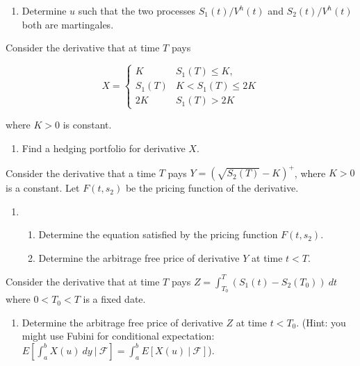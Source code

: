 \documentclass[a4paper,12pt,openany]{book}
\providecommand{\tightlist}{%
 \setlength{\itemsep}{0pt}\setlength{\parskip}{0pt}}
\begin{document}
\begin{enumerate}
\def\labelenumi{\alph{enumi}.}
\setcounter{enumi}{1}
\tightlist
\item
  Determine \(u\) such that the two processes \(S_1(t)/V^h(t)\) and \(S_2(t)/V^h(t)\) both are martingales.
\end{enumerate}

Consider the derivative that at time \(T\) pays

\[
X=
\begin{cases}
K & S_1(T)\le K,\\
S_1(T) & K<S_1(T)\le 2K\\
2K & S_1(T)>2K
\end{cases}
\]

where \(K>0\) is constant.

\begin{enumerate}
\def\labelenumi{\alph{enumi}.}
\setcounter{enumi}{2}
\tightlist
\item
  Find a hedging portfolio for derivative \(X\).
\end{enumerate}

Consider the derivative that a time \(T\) pays \(Y=\left(\sqrt{S_2(T)}-K\right)^+\), where \(K>0\) is a constant. Let \(F(t,s_2)\) be the pricing function of the derivative.

\begin{enumerate}
\def\labelenumi{\alph{enumi}.}
\setcounter{enumi}{3}
\item
  \begin{enumerate}
  \def\labelenumii{\roman{enumii}.}
  \tightlist
  \item
    Determine the equation satisfied by the pricing function \(F(t,s_2)\).
  \item
    Determine the arbitrage free price of derivative \(Y\) at time \(t<T\).
  \end{enumerate}
\end{enumerate}

Consider the derivative that at time \(T\) pays \(Z=\int_{T_0}^T(S_1(t)-S_2(T_0))\ dt\) where \(0<T_0<T\) is a fixed date.

\begin{enumerate}
\def\labelenumi{\alph{enumi}.}
\setcounter{enumi}{4}
\tightlist
\item
  Determine the arbitrage free price of derivative \(Z\) at time \(t<T_0\). (Hint: you might use Fubini for conditional expectation: \(E[\int_a^b X(u)\ dy\ \vert\ \mathcal{F}]=\int_a^bE[X(u)\ \vert\ \mathcal{F}]\)).
\end{enumerate}
\end{document}

